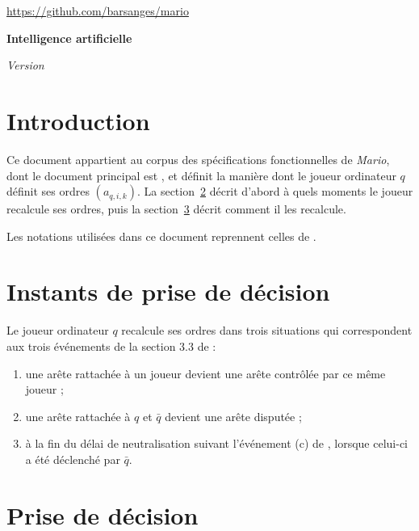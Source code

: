 \documentclass[a4paper,11pt,headings=normal]{scrartcl}
\theoremstyle{mythm}
\begin{document}
\begin{flushleft}
{\small \sffamily \url{https://github.com/barsanges/mario}}\vspace{0.8em}

{\raggedleft \bfseries\LARGE Intelligence artificielle}\vspace{0.8em}

{\itshape Version }
\end{flushleft}

\section{Introduction}

Ce document appartient au corpus des spécifications fonctionnelles de
\emph{Mario}, dont le document principal est
\cite{MarioReglesCourant}, et définit la manière dont le joueur
ordinateur $q$ définit ses ordres $(a_{q,i,k})$. La
section~\ref{temporalite} décrit d'abord à quels moments le joueur
recalcule ses ordres, puis la section~\ref{decisions} décrit comment
il les recalcule.

Les notations utilisées dans ce document reprennent celles de
\cite{MarioReglesCourant}.

\section{Instants de prise de décision}
\label{temporalite}

Le joueur ordinateur $q$ recalcule ses ordres dans trois situations
qui correspondent aux trois événements de la section 3.3 de
\cite{MarioReglesCourant} :
\begin{enumerate}
  \item une arête rattachée à un joueur devient une arête contrôlée
    par ce même joueur ;

  \item une arête rattachée à $q$ et $\bar q$ devient une arête
    disputée ;

  \item à la fin du délai de neutralisation suivant l'événement (c) de
    \cite{MarioReglesCourant}, lorsque celui-ci a été déclenché par
    $\bar q$.
\end{enumerate}

\section{Prise de décision}
\label{decisions}
\end{document}

